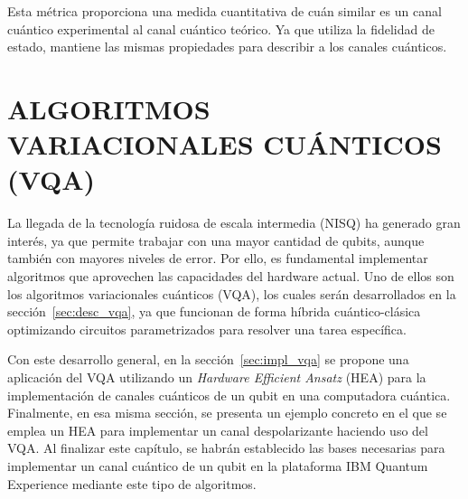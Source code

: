 \documentclass[letterpaper,12pt]{thesisECFM}
\theoremstyle{plain}
\theoremstyle{definition}
\theoremstyle{definition}
\theoremstyle{remark}
\newcommand{\1}{\mathbb{1}}
\begin{document}
Esta métrica proporciona una medida cuantitativa de cuán similar es un canal cuántico experimental al canal cuántico teórico. Ya que utiliza la fidelidad de estado, mantiene las mismas propiedades para describir a los canales cuánticos. 

\chapter{ALGORITMOS VARIACIONALES CUÁNTICOS (VQA)} %
\label{cap:algoritmos_variacionales}
La llegada de la tecnología ruidosa de escala intermedia (NISQ) ha generado
gran interés, ya que permite trabajar con una mayor cantidad de qubits, aunque
también con mayores niveles de error. Por ello, es fundamental implementar
algoritmos que aprovechen las capacidades del hardware actual. Uno de ellos
son los algoritmos variacionales cuánticos (VQA), los cuales serán
desarrollados en la sección~\ref{sec:desc_vqa}, ya que funcionan de forma
híbrida cuántico-clásica optimizando circuitos parametrizados para resolver
una tarea específica.

Con este desarrollo general, en la sección~\ref{sec:impl_vqa} se propone una
aplicación del VQA utilizando un \textit{Hardware Efficient Ansatz} (HEA) para
la implementación de canales cuánticos de un qubit en una computadora cuántica.
Finalmente, en esa misma sección, se presenta un ejemplo concreto en el que se
emplea un HEA para implementar un canal despolarizante haciendo uso del VQA. Al
finalizar este capítulo, se habrán establecido las bases necesarias para
implementar un canal cuántico de un qubit en la plataforma IBM Quantum
Experience mediante este tipo de algoritmos.

\end{document}
